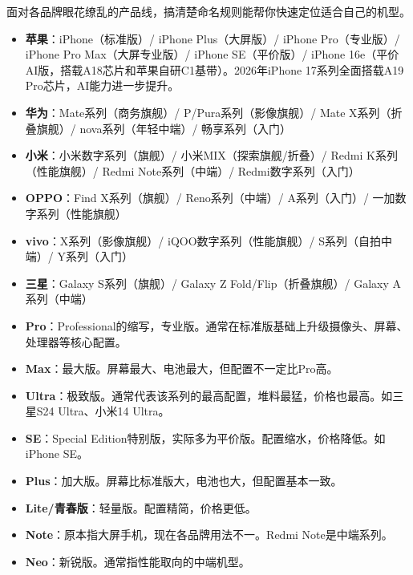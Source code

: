 
面对各品牌眼花缭乱的产品线，搞清楚命名规则能帮你快速定位适合自己的机型。


\begin{itemize}
  \item \textbf{苹果}：iPhone（标准版）/ iPhone Plus（大屏版）/ iPhone Pro（专业版）/ iPhone Pro Max（大屏专业版）/ iPhone SE（平价版）/ iPhone 16e（平价AI版，搭载A18芯片和苹果自研C1基带）。2026年iPhone 17系列全面搭载A19 Pro芯片，AI能力进一步提升。
  \item \textbf{华为}：Mate系列（商务旗舰）/ P/Pura系列（影像旗舰）/ Mate X系列（折叠旗舰）/ nova系列（年轻中端）/ 畅享系列（入门）
  \item \textbf{小米}：小米数字系列（旗舰）/ 小米MIX（探索旗舰/折叠）/ Redmi K系列（性能旗舰）/ Redmi Note系列（中端）/ Redmi数字系列（入门）
  \item \textbf{OPPO}：Find X系列（旗舰）/ Reno系列（中端）/ A系列（入门）/ 一加数字系列（性能旗舰）
  \item \textbf{vivo}：X系列（影像旗舰）/ iQOO数字系列（性能旗舰）/ S系列（自拍中端）/ Y系列（入门）
  \item \textbf{三星}：Galaxy S系列（旗舰）/ Galaxy Z Fold/Flip（折叠旗舰）/ Galaxy A系列（中端）
\end{itemize}


\begin{itemize}
  \item \textbf{Pro}：Professional的缩写，专业版。通常在标准版基础上升级摄像头、屏幕、处理器等核心配置。
  \item \textbf{Max}：最大版。屏幕最大、电池最大，但配置不一定比Pro高。
  \item \textbf{Ultra}：极致版。通常代表该系列的最高配置，堆料最猛，价格也最高。如三星S24 Ultra、小米14 Ultra。
  \item \textbf{SE}：Special Edition特别版，实际多为平价版。配置缩水，价格降低。如iPhone SE。
  \item \textbf{Plus}：加大版。屏幕比标准版大，电池也大，但配置基本一致。
  \item \textbf{Lite/青春版}：轻量版。配置精简，价格更低。
  \item \textbf{Note}：原本指大屏手机，现在各品牌用法不一。Redmi Note是中端系列。
  \item \textbf{Neo}：新锐版。通常指性能取向的中端机型。
\end{itemize}


